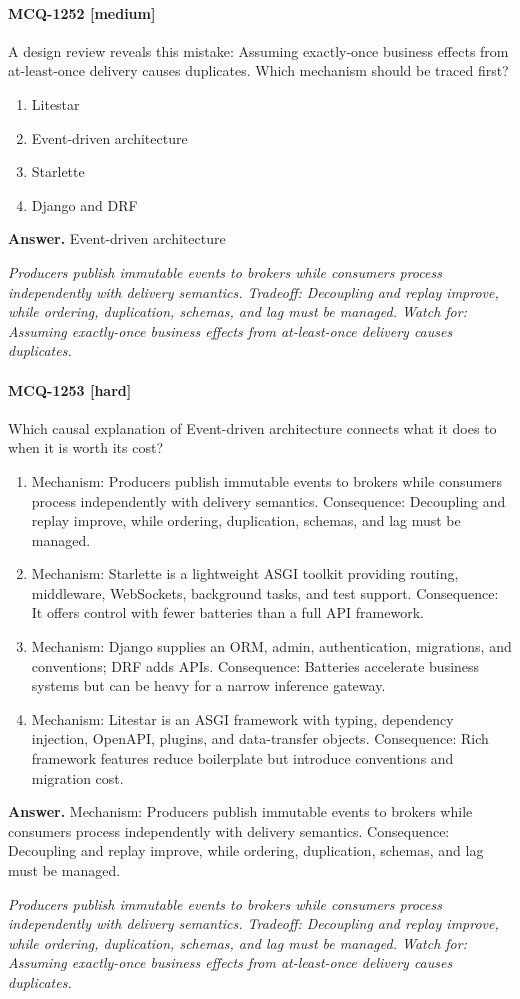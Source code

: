 \paragraph{MCQ-1252 [medium]} A design review reveals this mistake: Assuming exactly-once business effects from at-least-once delivery causes duplicates. Which mechanism should be traced first?
\begin{enumerate}[label=\Alph*.]
\item Litestar
\item Event-driven architecture
\item Starlette
\item Django and DRF
\end{enumerate}
\noindent\textbf{Answer.} Event-driven architecture
\par\textit{Producers publish immutable events to brokers while consumers process independently with delivery semantics. Tradeoff: Decoupling and replay improve, while ordering, duplication, schemas, and lag must be managed. Watch for: Assuming exactly-once business effects from at-least-once delivery causes duplicates.}
\paragraph{MCQ-1253 [hard]} Which causal explanation of Event-driven architecture connects what it does to when it is worth its cost?
\begin{enumerate}[label=\Alph*.]
\item Mechanism: Producers publish immutable events to brokers while consumers process independently with delivery semantics. Consequence: Decoupling and replay improve, while ordering, duplication, schemas, and lag must be managed.
\item Mechanism: Starlette is a lightweight ASGI toolkit providing routing, middleware, WebSockets, background tasks, and test support. Consequence: It offers control with fewer batteries than a full API framework.
\item Mechanism: Django supplies an ORM, admin, authentication, migrations, and conventions; DRF adds APIs. Consequence: Batteries accelerate business systems but can be heavy for a narrow inference gateway.
\item Mechanism: Litestar is an ASGI framework with typing, dependency injection, OpenAPI, plugins, and data-transfer objects. Consequence: Rich framework features reduce boilerplate but introduce conventions and migration cost.
\end{enumerate}
\noindent\textbf{Answer.} Mechanism: Producers publish immutable events to brokers while consumers process independently with delivery semantics. Consequence: Decoupling and replay improve, while ordering, duplication, schemas, and lag must be managed.
\par\textit{Producers publish immutable events to brokers while consumers process independently with delivery semantics. Tradeoff: Decoupling and replay improve, while ordering, duplication, schemas, and lag must be managed. Watch for: Assuming exactly-once business effects from at-least-once delivery causes duplicates.}
